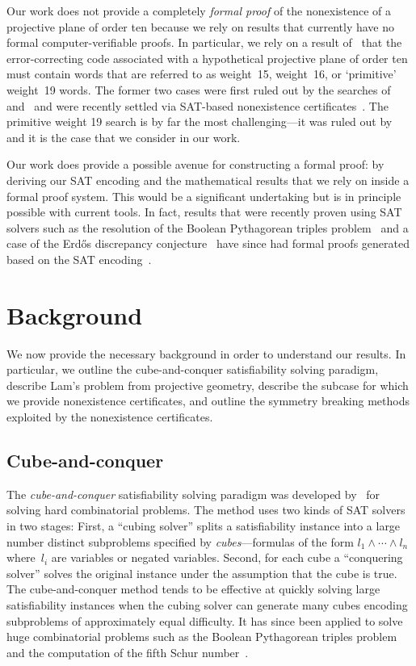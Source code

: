 \documentclass[letterpaper]{article}
\begin{document}
Our work does not provide a completely \emph{formal proof} of the nonexistence of a projective
plane of order ten because we rely on results that currently have no formal
computer-verifiable proofs.
In particular, we rely on a result of~\cite{carter1974existence}
that the error-correcting code associated with a hypothetical projective
plane of order ten must contain words that are referred to as
weight~15, weight~16, or `primitive' weight~19 words.
The former two cases were first ruled out by the searches
of~\cite{macwilliams1973existence} and~\cite{lam1986nonexistence}
and were recently settled via SAT-based nonexistence certificates~\cite{bright2020nonexistence,bright2020unsatisfiability}.
The primitive weight 19
search is by far the most challenging---it was ruled out by~\cite{lam1989non}
and it is the case that we consider in our work.

Our work does provide a possible
avenue for constructing a formal proof: by deriving our SAT encoding
and the mathematical results that we rely on inside a formal proof system.
This would be a significant undertaking but is in principle possible with
current tools.  In fact, results that
were recently proven using SAT solvers such as the resolution of the Boolean Pythagorean
triples problem~\cite{heule2016solving} and a case of the Erd\H{o}s
discrepancy conjecture~\cite{konev2014sat} have since had formal proofs generated based on the
SAT encoding~\cite{cruz2018formally,keller2019}.

\section{Background}\label{sec:background}

We now provide the necessary background in order to understand our results.
In particular, we outline the cube-and-conquer satisfiability solving paradigm,
describe Lam's problem from projective geometry, describe the subcase
for which we provide nonexistence certificates, and outline the symmetry
breaking methods exploited by the nonexistence certificates.

\subsection{Cube-and-conquer}

The \emph{cube-and-conquer} satisfiability solving paradigm was
developed by~\cite{heule2011cube} for solving hard combinatorial
problems.  The method uses two kinds of SAT solvers in two stages:
First, a ``cubing solver'' splits a satisfiability instance into
a large number distinct subproblems specified by \emph{cubes}---formulas
of the form $l_1\land\dotsb\land l_n$ where~$l_i$ are variables
or negated variables.  Second, for each cube a ``conquering solver'' solves the
original instance under the assumption that the cube is true.
The cube-and-conquer method tends to be effective at quickly solving large
satisfiability instances when the cubing solver can generate many cubes
encoding subproblems of approximately equal difficulty.  It has since been applied to
solve huge combinatorial problems such as the Boolean Pythagorean
triples problem~\cite{heule2017solving} and the computation of the fifth
Schur number~\cite{heule2018schur}.
\end{document}
